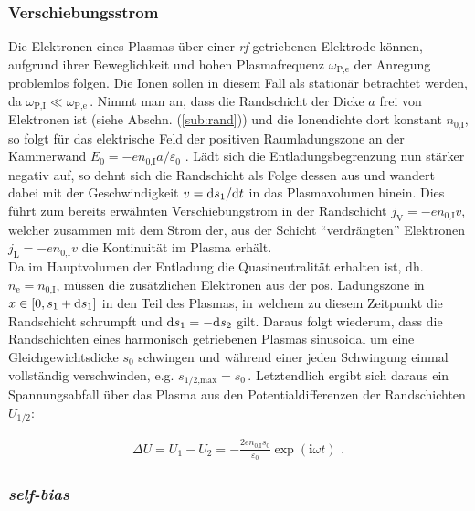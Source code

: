 \documentclass[numbers=noenddot,a4paper]{scrartcl}
\newcommand{\diff}{\textnormal{d}}
\newcommand{\ix}[1]{_\text{#1}}
\newcommand{\imag}{\mathbf{i}}
\newcommand{\tilt}[1]{\textit{#1}}
\begin{document}
		\subsubsection*{Verschiebungsstrom}
	
		Die Elektronen eines Plasmas über einer \tilt{rf}-getriebenen Elektrode können, aufgrund ihrer Beweglichkeit und hohen Plasmafrequenz $\omega\ix{P,e}$ der Anregung problemlos folgen. Die Ionen sollen in diesem Fall als stationär betrachtet werden, da $\omega\ix{P,I}\ll\omega\ix{P,e}\,$. Nimmt man an, dass die Randschicht der Dicke $a$ frei von Elektronen ist (siehe Abschn. (\ref{sub:rand})) und die Ionendichte dort konstant $n\ix{0,I}$, so folgt für das elektrische Feld der positiven Raumladungszone an der Kammerwand $E\ix{0}=-en\ix{0,I}a/\varepsilon\ix{0}\,\,$. Lädt sich die Entladungsbegrenzung nun stärker negativ auf, so dehnt sich die Randschicht als Folge dessen aus und wandert dabei mit der Geschwindigkeit $v=\diff s\ix{1}/\diff t$ in das Plasmavolumen hinein. Dies führt zum bereits erwähnten Verschiebungstrom in der Randschicht $j\ix{V}=-en\ix{0,I}v$, welcher zusammen mit dem Strom der, aus der Schicht "`verdrängten"' Elektronen $j\ix{L}=-en\ix{0,I}v$ die Kontinuität im Plasma erhält.\\
		Da im Hauptvolumen der Entladung die Quasineutralität erhalten ist, dh. $n\ix{e}=n\ix{0,I}$, müssen die zusätzlichen Elektronen aus der pos. Ladungszone in $x\in\left[0,s\ix{1}+\diff s\ix{1}\right]$ in den Teil des Plasmas, in welchem zu diesem Zeitpunkt die Randschicht schrumpft und $\diff s\ix{1}=-\diff s\ix{2}$ gilt. Daraus folgt wiederum, dass die Randschichten eines harmonisch getriebenen Plasmas sinusoidal um eine Gleichgewichtsdicke $s\ix{0}$ schwingen und während einer jeden Schwingung einmal vollständig verschwinden, e.g. $s\ix{1/2,max}=s\ix{0}\,$.  Letztendlich ergibt sich daraus ein Spannungsabfall über das Plasma aus den Potentialdifferenzen der Randschichten $U\ix{1/2}$:
		
			\begin{align}
				\Delta U=U\ix{1}-U\ix{2}=-\frac{2en\ix{0,I}s\ix{0}}{\varepsilon\ix{0}}\exp\left(\imag\omega t\right)\,\,.
			\end{align}
			
		\subsubsection*{\tilt{self-bias}}
		
\end{document}
